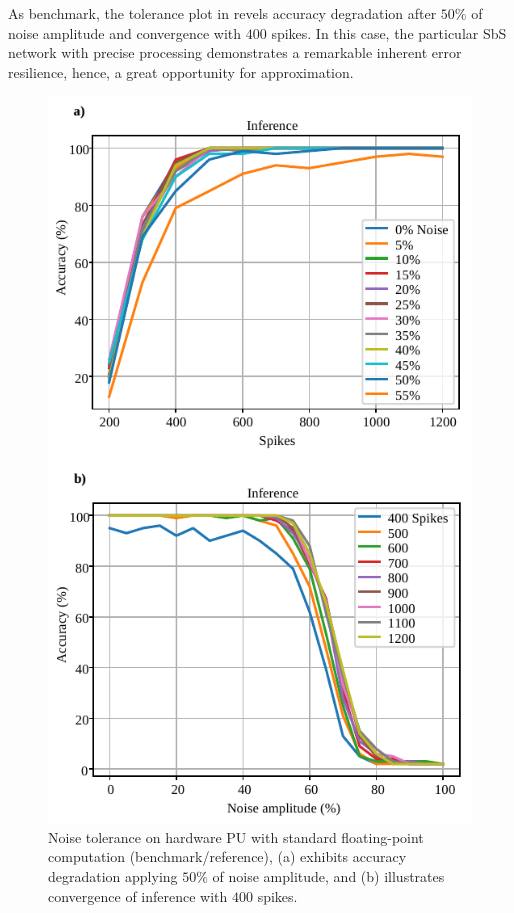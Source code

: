 As benchmark, the tolerance plot in  revels accuracy degradation after $50\%$ of noise amplitude and convergence with $400$ spikes. In this case, the particular SbS network with precise processing demonstrates a remarkable inherent error resilience, hence, a great opportunity for approximation.


\begin{figure}[h!]
	\centering
	\includegraphics[width=1\columnwidth]{../figures/accuracy_vs_noise_pu_fp.pdf}
	\caption{Noise tolerance on hardware PU with standard floating-point computation (benchmark/reference), (a) exhibits accuracy degradation applying $50\%$ of noise amplitude, and (b) illustrates convergence of inference with $400$ spikes.}
	\label{fig:accuracy_vs_noise_pu_fp}
\end{figure}

